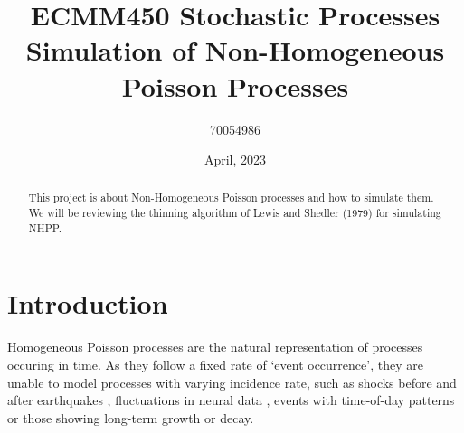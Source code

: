\documentclass[%
 reprint,
 amsmath,amssymb,
 aps,
]{revtex4-2}
\theoremstyle{definition}
\begin{document}

\title{ECMM450 Stochastic Processes\\Simulation of Non-Homogeneous Poisson Processes}%

\author{70054986}


\date{April, 2023}%

\begin{abstract}
This project is about Non-Homogeneous Poisson processes and how to simulate them. We will be reviewing the thinning algorithm of Lewis and Shedler (1979) for simulating NHPP.

\end{abstract}

\maketitle

\section{\label{sec:level1}Introduction}

Homogeneous Poisson processes are the natural representation of processes occuring in time. As they follow a fixed rate of `event occurrence', they are unable to model processes with varying incidence rate, such as shocks before and after earthquakes \cite{vere-jones_1970}, fluctuations in neural data \cite{gabbiani_cox_2010}, events with time-of-day patterns or those showing long-term growth or decay.\\
\end{document}
